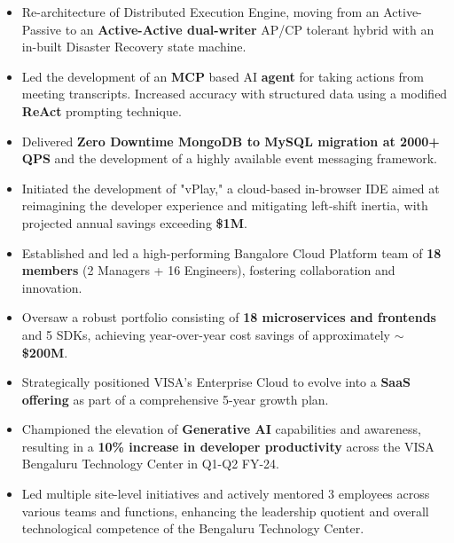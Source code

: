 \begin{itemize}
    \item Re-architecture of Distributed Execution Engine, moving from an Active-Passive to an \textbf{Active-Active dual-writer} AP/CP tolerant hybrid with an in-built Disaster Recovery state machine.
    \item Led the development of an \textbf{MCP} based AI \textbf{agent} for taking actions from meeting transcripts. Increased accuracy with structured data using a modified \textbf{ReAct} prompting technique. 
    \item Delivered \textbf{Zero Downtime MongoDB to MySQL migration at 2000+ QPS} and the development of a highly available event messaging framework.
    \item Initiated the development of "vPlay," a cloud-based in-browser IDE aimed at reimagining the developer experience and mitigating left-shift inertia, with projected annual savings exceeding \textbf{\$1M}.
    \item Established and led a high-performing Bangalore Cloud Platform team of \textbf{18 members} (2 Managers + 16 Engineers), fostering collaboration and innovation.
    \item Oversaw a robust portfolio consisting of \textbf{18 microservices and frontends} and 5 SDKs, achieving year-over-year cost savings of approximately \textbf{\(\sim\)\$200M}.
    \item Strategically positioned VISA's Enterprise Cloud to evolve into a \textbf{SaaS offering} as part of a comprehensive 5-year growth plan.
    \item Championed the elevation of \textbf{Generative AI} capabilities and awareness, resulting in a \textbf{10\% increase in developer productivity} across the VISA Bengaluru Technology Center in Q1-Q2 FY-24.
    \item Led multiple site-level initiatives and actively mentored 3 employees across various teams and functions, enhancing the leadership quotient and overall technological competence of the Bengaluru Technology Center.
  \end{itemize}
